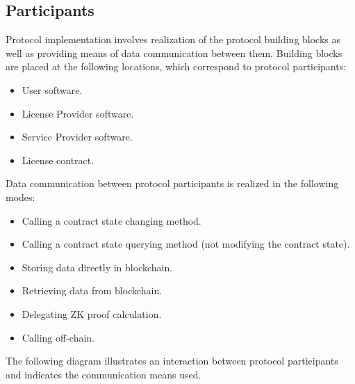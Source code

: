 
\subsection{Participants} 
Protocol implementation involves realization of the protocol building blocks as well as providing means of data communication between them. Building blocks are placed at the following locations, which correspond to protocol participants:

\begin{itemize}%
	\item User software.
	\item License Provider software.
	\item Service Provider software.
	\item License contract.
\end{itemize}

\begin{flushleft}
Data communication between protocol participants is realized in the following modes:
\end{flushleft}

\begin{itemize}%
	\item Calling a contract state changing method.
	\item Calling a contract state querying method (not modifying the contract state).
	\item Storing data directly in blockchain.
	\item Retrieving data from blockchain.
	\item Delegating ZK proof calculation.
	\item Calling off-chain.
\end{itemize}

\begin{flushleft}
The following diagram illustrates an interaction between protocol participants and indicates the communication means used.
\end{flushleft}

